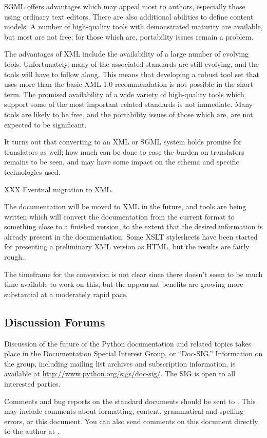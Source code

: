 \documentclass{howto}
\begin{document}
    SGML offers advantages which may appeal most to authors,
    especially those using ordinary text editors.  There are also
    additional abilities to define content models.  A number of
    high-quality tools with demonstrated maturity are available, but
    most are not free; for those which are, portability issues remain
    a problem.

    The advantages of XML include the availability of a large number
    of evolving tools.  Unfortunately, many of the associated
    standards are still evolving, and the tools will have to follow
    along.  This means that developing a robust tool set that uses
    more than the basic XML 1.0 recommendation is not possible in the
    short term.  The promised availability of a wide variety of
    high-quality tools which support some of the most important
    related standards is not immediate.  Many tools are likely to be
    free, and the portability issues of those which are, are not
    expected to be significant.

    It turns out that converting to an XML or SGML system holds
    promise for translators as well; how much can be done to ease the
    burden on translators remains to be seen, and may have some impact
    on the schema and specific technologies used.

    XXX Eventual migration to XML.

    The documentation will be moved to XML in the future, and tools
    are being written which will convert the documentation from the
    current format to something close to a finished version, to the
    extent that the desired information is already present in the
    documentation.  Some XSLT stylesheets have been started for
    presenting a preliminary XML version as HTML, but the results are
    fairly rough..

    The timeframe for the conversion is not clear since there doesn't
    seem to be much time available to work on this, but the appearant
    benefits are growing more substantial at a moderately rapid pace.


  \subsection{Discussion Forums \label{discussion}}

    Discussion of the future of the Python documentation and related
    topics takes place in the Documentation Special Interest Group, or
    ``Doc-SIG.''  Information on the group, including mailing list
    archives and subscription information, is available at
    \url{http://www.python.org/sigs/doc-sig/}.  The SIG is open to all
    interested parties.

    Comments and bug reports on the standard documents should be sent
    to .  This may include comments
    about formatting, content, grammatical and spelling errors, or
    this document.  You can also send comments on this document
    directly to the author at .
\end{document}

